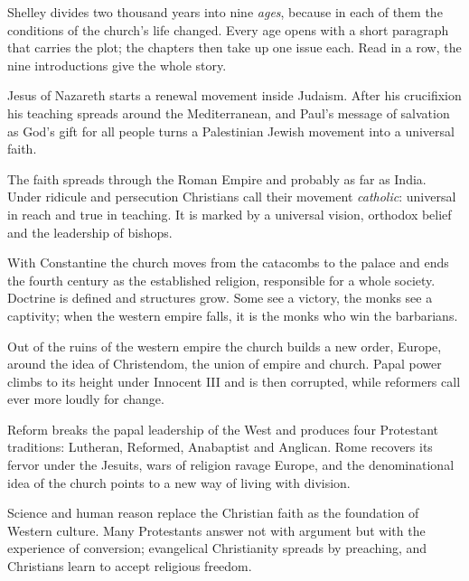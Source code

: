 
Shelley divides two thousand years into nine \emph{ages}, because in each of them the conditions of the
church's life changed. Every age opens with a short paragraph that carries the plot; the chapters then
take up one issue each. Read in a row, the nine introductions give the whole story.

{Jesus of Nazareth starts a renewal movement inside Judaism. After his crucifixion his teaching spreads
around the Mediterranean, and Paul's message of salvation as God's gift for all people turns a Palestinian
Jewish movement into a universal faith.}

{The faith spreads through the Roman Empire and probably as far as India. Under ridicule and persecution
Christians call their movement \emph{catholic}: universal in reach and true in teaching. It is marked by
a universal vision, orthodox belief and the leadership of bishops.}

{With Constantine the church moves from the catacombs to the palace and ends the fourth century as the
established religion, responsible for a whole society. Doctrine is defined and structures grow. Some
see a victory, the monks see a captivity; when the western empire falls, it is the monks who win the
barbarians.}

{Out of the ruins of the western empire the church builds a new order, Europe, around the idea of
Christendom, the union of empire and church. Papal power climbs to its height under Innocent III and
is then corrupted, while reformers call ever more loudly for change.}

{Reform breaks the papal leadership of the West and produces four Protestant traditions: Lutheran,
Reformed, Anabaptist and Anglican. Rome recovers its fervor under the Jesuits, wars of religion ravage
Europe, and the denominational idea of the church points to a new way of living with division.}

{Science and human reason replace the Christian faith as the foundation of Western culture. Many
Protestants answer not with argument but with the experience of conversion; evangelical Christianity
spreads by preaching, and Christians learn to accept religious freedom.}

